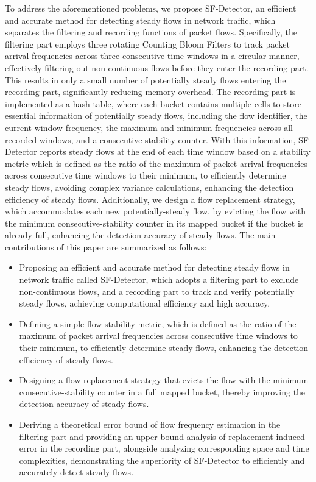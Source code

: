 \documentclass[preprint,12pt]{elsarticle}
\begin{document}
To address the aforementioned problems, we propose SF-Detector, an efficient and accurate method for detecting steady flows in network traffic, which separates the filtering and recording functions of packet flows. Specifically, the filtering part employs three rotating Counting Bloom Filters to track packet arrival frequencies across three consecutive time windows in a circular manner, effectively filtering out non-continuous flows before they enter the recording part. This results in only a small number of potentially steady flows entering the recording part, significantly reducing memory overhead. The recording part is implemented as a hash table, where each bucket contains multiple cells to store essential information of potentially steady flows, including the flow identifier, the current-window frequency, the maximum and minimum frequencies across all recorded windows, and a consecutive-stability counter. With this information, SF-Detector reports steady flows at the end of each time window based on a stability metric which is defined as the ratio of the maximum of packet arrival frequencies across consecutive time windows to their minimum, to efficiently determine steady flows, avoiding complex variance calculations, enhancing the detection efficiency of steady flows. Additionally, we design a flow replacement strategy, which accommodates each new potentially-steady flow, by evicting the flow with the minimum consecutive-stability counter in its mapped bucket if the bucket is already full, enhancing the detection accuracy of steady flows. The main contributions of this paper are summarized as follows:
\begin{itemize}
    \item Proposing an efficient and accurate method for detecting steady flows in network traffic called SF-Detector, which adopts a filtering part to exclude non-continuous flows, and a recording part to track and verify potentially steady flows, achieving computational efficiency and high accuracy.
    \item Defining a simple flow stability metric, which is defined as the ratio of the maximum of packet arrival frequencies across consecutive time windows to their minimum, to efficiently determine steady flows, enhancing the detection efficiency of steady flows.
    \item Designing a flow replacement strategy that evicts the flow with the minimum consecutive-stability counter in a full mapped bucket, thereby improving the detection accuracy of steady flows.
    \item Deriving a theoretical error bound of flow frequency estimation in the filtering part and providing an upper-bound analysis of replacement-induced error in the recording part, alongside analyzing corresponding space and time complexities, demonstrating the superiority of SF-Detector to efficiently and accurately detect steady flows.
\end{itemize}
\end{document}
